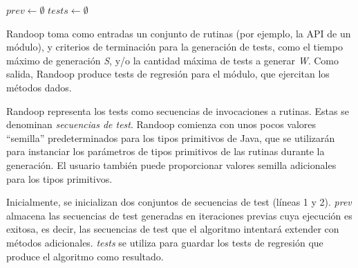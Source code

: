 \begin{algorithm}[H]
    \SetAlgoLined
    
    $prev \leftarrow \emptyset$\;
    $tests \leftarrow \emptyset$\;
    
    \;
    \end{algorithm}

\textsf{Randoop} toma como entradas un conjunto de rutinas (por ejemplo, la API
de un módulo), y criterios de terminación para la generación de tests, como el tiempo
máximo de generación \emph{S}, y/o la cantidad máxima de tests a generar \emph{W}.
Como salida, \textsf{Randoop} produce tests de regresión para el módulo, que
ejercitan los métodos dados.

\textsf{Randoop} representa los tests como secuencias de invocaciones a 
rutinas. Estas se denominan \emph{secuencias de
test}. \textsf{Randoop} comienza con unos pocos valores ``semilla''
predeterminados para los tipos primitivos de Java, que se utilizarán para
instanciar los parámetros de tipos primitivos de las rutinas durante la
generación. El usuario también puede proporcionar valores semilla adicionales
para los tipos primitivos. 

Inicialmente, se inicializan dos conjuntos de secuencias de test (líneas 1 y 2). 
\emph{prev} almacena las secuencias de test generadas en iteraciones previas cuya
ejecución es exitosa, es decir, las secuencias de test que el algoritmo intentará
extender con métodos adicionales. \emph{tests} se utiliza para guardar los tests
de regresión que produce el algoritmo como resultado.


